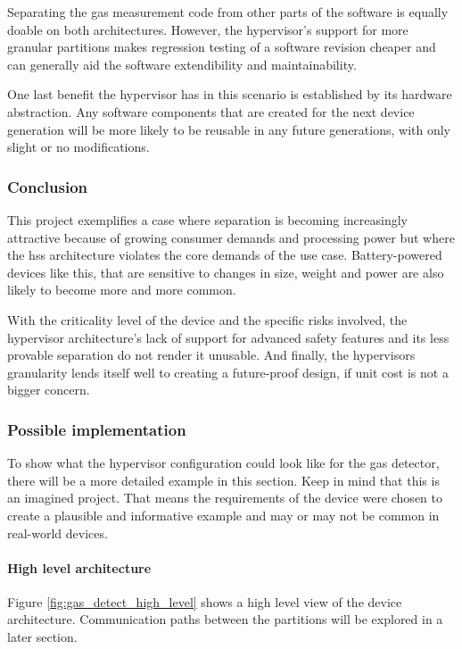 Separating the gas measurement code from other parts of the software is equally doable on both architectures. However, the hypervisor's support for more granular partitions makes regression testing of a software revision cheaper and can generally aid the software extendibility and maintainability.

One last benefit the hypervisor has in this scenario is established by its hardware abstraction. Any software components that are created for the next device generation will be more likely to be reusable in any future generations, with only slight or no modifications.
\subsubsection{Conclusion}
This project exemplifies a case where separation is becoming increasingly attractive because of growing consumer demands and processing power but where the \acrshort{hss} architecture violates the core demands of the use case. Battery-powered devices like this, that are sensitive to changes in size, weight and power are also likely to become more and more common.

With the criticality level of the device and the specific risks involved, the hypervisor architecture's lack of support for advanced safety features and its less provable separation do not render it unusable. And finally, the hypervisors granularity lends itself well to creating a future-proof design, if unit cost is not a bigger concern. 
\subsubsection{Possible implementation}
To show what the hypervisor configuration could look like for the gas detector, there will be a more detailed example in this section. Keep in mind that this is an imagined project. That means the requirements of the device were chosen to create a plausible and informative example and may or may not be common in real-world devices.

\paragraph{High level architecture}
Figure \ref{fig:gas_detect_high_level} shows a high level view of the device architecture. Communication paths between the partitions will be explored in a later section.

